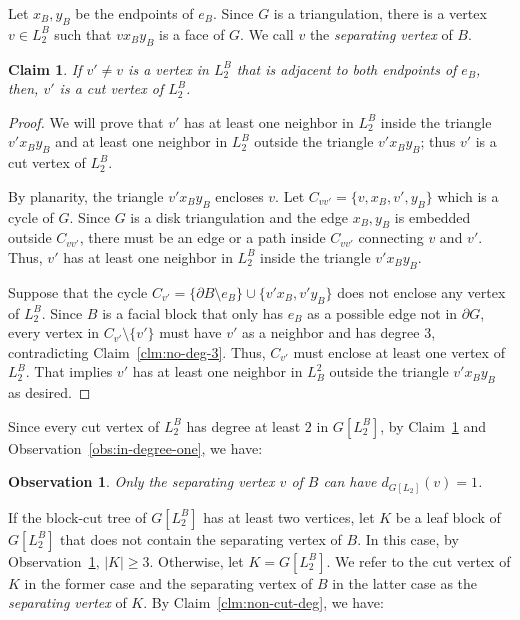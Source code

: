 \documentclass[11pt]{article}
\newtheorem{claim}[theorem]{Claim}
\newtheorem{observation}[theorem]{Observation}
\begin{document}
Let $x_B,y_B$ be the endpoints of $e_B$.  Since $G$ is a triangulation, there is a vertex $v \in L_2^B$ such that $vx_By_B$ is a face of $G$. We call $v$ the \emph{separating vertex} of $B$.

\begin{claim} \label{clm:e-B-cut}
If $v' \not= v$ is a vertex in $L_2^B$ that is adjacent to both endpoints of $e_B$, then, $v'$ is a cut vertex of $L_2^B$.
\end{claim}

\begin{proof}
We will prove that $v'$ has at least one neighbor in $L_2^B$ inside the triangle $v'x_By_B$  and at least one neighbor in $L_2^B$ outside the triangle $v'x_By_B$; thus $v'$ is a cut vertex of $L_2^B$. 

By planarity, the triangle $v'x_By_B$ encloses $v$. Let $C_{vv'} = \{v,x_B,v',y_B\}$ which is a cycle of $G$.  Since $G$ is a disk triangulation and the edge $x_B,y_B$ is embedded outside $C_{vv'}$, there must be an edge or a path inside $C_{vv'}$ connecting $v$ and $v'$. Thus, $v'$ has at least one neighbor in $L^B_2$ inside the triangle $v'x_By_B$.

Suppose that the cycle $C_{v'} = \{\partial B \setminus e_B\} \cup \{v'x_B,v'y_B\}$ does not enclose any vertex of $L^B_2$. Since $B$ is a facial block that only has $e_B$ as a possible edge not in $\partial G$, every vertex in $C_{v'} \setminus \{v'\}$ must have $v'$ as a neighbor and has degree 3, contradicting Claim~\ref{clm:no-deg-3}. Thus, $C_{v'}$ must enclose at least one vertex of $L^B_2$. That implies $v'$ has at least one neighbor in $L^2_B$ outside the triangle $v'x_By_B$ as desired. 
\end{proof}


Since every cut vertex of $L_2^B$ has degree at least $2$ in $G[L_2^B]$, by Claim~\ref{clm:e-B-cut} and Observation~\ref{obs:in-degree-one}, we have:

\begin{observation} \label{obs:deg-one-unique}
Only the separating vertex $v$ of $B$ can have $d_{G[L_2]}(v) = 1$.
\end{observation}

If the block-cut tree of $G[L_2^B]$ has at least two vertices, let $K$ be a leaf block of $G[L_2^B]$ that does not contain the separating vertex of $B$. In this case, by Observation~\ref{obs:deg-one-unique}, $|K| \geq 3$.  Otherwise, let $K  = G[L_2^B]$. We refer to the cut vertex of $K$ in the former case and the separating vertex of $B$ in the latter case as the \emph{separating vertex} of $K$. By Claim~\ref{clm:non-cut-deg}, we have:
\end{document}
